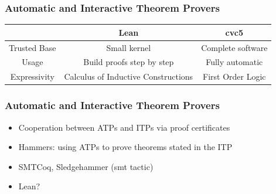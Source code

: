 \documentclass[usepdftitle=false,aspectratio=169,usenames,dvipsnames]{beamer}
\newcommand\vitem{\vfill\item}
\begin{document}
\begin{frame}
  \frametitle{Automatic and Interactive Theorem Provers}
  \begin{table}[]
  \begin{tabular}{|c|c|c|}
  \hline
              & \textbf{Lean}                                & \textbf{cvc5}                          \\ \hline
  Trusted Base & Small kernel                        & Complete software             \\
  Usage        & Build proofs step by step           & Fully automatic               \\
  Expressivity & Calculus of Inductive Constructions & First Order Logic \\ \hline
  \end{tabular}
  \end{table}
\end{frame}


\begin{frame}
  \frametitle{Automatic and Interactive Theorem Provers}
  \begin{itemize}
    \item Cooperation between ATPs and ITPs via proof certificates
    \vitem Hammers: using ATPs to prove theorems stated in the ITP
    \vitem SMTCoq, Sledgehammer (smt tactic)
    \vitem Lean?
  \end{itemize}
\end{frame}
\end{document}
